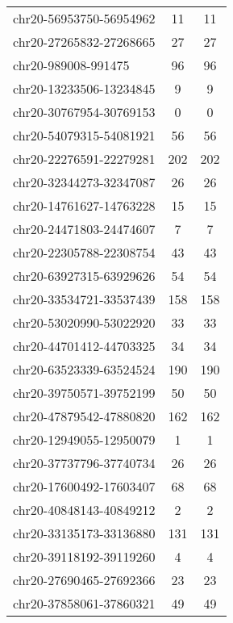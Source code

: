 \documentclass[10pt,letterpaper]{article}
\begin{document}
{\begin{longtable}{lSS}
	chr20-56953750-56954962 & 11     & 11                    \\
	chr20-27265832-27268665 & 27     & 27                    \\
	chr20-989008-991475     & 96     & 96                    \\
	chr20-13233506-13234845 & 9      & 9                     \\
	chr20-30767954-30769153 & 0      & 0                     \\
	chr20-54079315-54081921 & 56     & 56                    \\
	chr20-22276591-22279281 & 202    & 202                   \\
	chr20-32344273-32347087 & 26     & 26                    \\
	chr20-14761627-14763228 & 15     & 15                    \\
	chr20-24471803-24474607 & 7      & 7                     \\
	chr20-22305788-22308754 & 43     & 43                    \\
	chr20-63927315-63929626 & 54     & 54                    \\
	chr20-33534721-33537439 & 158    & 158                   \\
	chr20-53020990-53022920 & 33     & 33                    \\
	chr20-44701412-44703325 & 34     & 34                    \\
	chr20-63523339-63524524 & 190    & 190                   \\
	chr20-39750571-39752199 & 50     & 50                    \\
	chr20-47879542-47880820 & 162    & 162                   \\
	chr20-12949055-12950079 & 1      & 1                     \\
	chr20-37737796-37740734 & 26     & 26                    \\
	chr20-17600492-17603407 & 68     & 68                    \\
	chr20-40848143-40849212 & 2      & 2                     \\
	chr20-33135173-33136880 & 131    & 131                   \\
	chr20-39118192-39119260 & 4      & 4                     \\
	chr20-27690465-27692366 & 23     & 23                    \\
	chr20-37858061-37860321 & 49     & 49                    \\

\end{longtable}}
\end{document}
